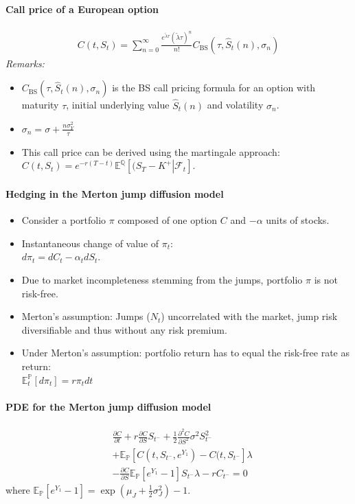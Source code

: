 \documentclass[a4paper,landscape,7pt,fleqn]{scrartcl}
\begin{document}
\begin{multicols*}{3}
\paragraph{Call price of a European option}
\begin{align*}
C(t,S_t) = \sum_{n=0}^\infty \frac{e^{\tilde \lambda \tau} (\tilde \lambda \tau)^n}{n!} C_\text{BS}(\tau, \hat S_t(n), \sigma_n)
\end{align*}
\textit{Remarks:}
\begin{itemize}
\item $C_\text{BS}(\tau, \hat S_t(n), \sigma_n)$ is the BS call pricing formula for an option with maturity $\tau$, initial underlying value $\hat S_t(n)$ and volatility $\sigma_n$.
\item $\sigma_n = \sigma + \frac{n \sigma_Y^2}{\tau}$
\item This call price can be derived using the martingale approach: \\
$C(t,S_t) = e^{-r(T-t)} \mathbb{E}^\mathbb{Q} \left[ \left. (S_T - K^+ \right| \mathcal{F}_t \right]$.
\end{itemize}

\paragraph{Hedging in the Merton jump diffusion model}
\begin{itemize}
\item Consider a portfolio $\pi$ composed of one option $C$ and $-\alpha$ units of stocks.
\item Instantaneous change of value of $\pi_t$: \\
$d\pi_t = dC_t - \alpha_t dS_t$.
\item Due to market incompleteness stemming from the jumps, portfolio $\pi$ is not risk-free.
\item Merton's assumption: Jumps ($N_t$) uncorrelated with the market, jump risk diversifiable and thus without any risk premium.
\item Under Merton's assumption: portfolio return has to equal the risk-free rate as return: \\
$\mathbb{E}_t^\mathbb{P} \left[ d\pi_t \right] = r \pi_t dt$
\end{itemize}

\paragraph{PDE for the Merton jump diffusion model}
\begin{align*}
&  \frac{\partial C}{\partial t} + r \frac{\partial C}{\partial S} S_{t^-} + \frac{1}{2} \frac{\partial^2 C}{\partial S^2} \sigma^2 S_{t^-}^2 \\
& + \mathbb{E}_\mathbb{P} \left[ C(t,S_{t^-}, e^{Y_1}) - C(t,S_{t^-} \right] \lambda \\
& - \frac{\partial C}{\partial S} \mathbb{E}_\mathbb{P} \left[e^{Y_1} - 1 \right] S_{t^-} \lambda - r C_{t^-} = 0
\end{align*}
where $\mathbb{E}_\mathbb{P} \left[ e^{Y_1} - 1 \right] = \exp \left( \mu_J + \frac{1}{2} \sigma_J^2 \right) -1$.


\end{multicols*}
\end{document}
